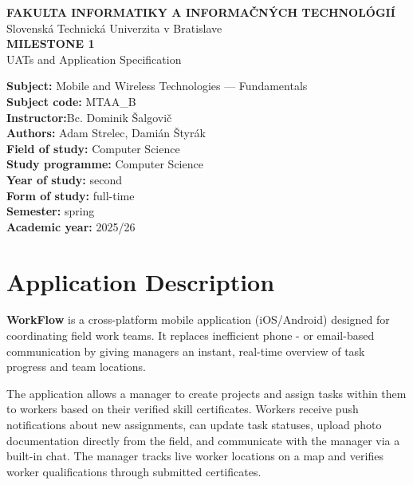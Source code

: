 \documentclass[12pt,a4paper]{article}
\begin{document}
\begin{titlepage}
\begin{center}
    \textbf{FAKULTA INFORMATIKY A INFORMAČNÝCH TECHNOLÓGIÍ}\\
    Slovenská Technická Univerzita v Bratislave\\[3cm]

    {\LARGE\textbf{MILESTONE 1}}\\[0.3cm]
    {\large UATs and Application Specification}\\[3cm]
\end{center}

\vfill

\noindent\textbf{Subject:} Mobile and Wireless Technologies --- Fundamentals\\
\textbf{Subject code:} MTAA\_B\\
\textbf{Instructor:}Bc. Dominik Šalgovič\\
\textbf{Authors:} Adam Strelec, Damián Štyrák\\
\textbf{Field of study:} Computer Science\\
\textbf{Study programme:} Computer Science\\
\textbf{Year of study:} second\\
\textbf{Form of study:} full-time\\
\textbf{Semester:} spring\\
\textbf{Academic year:} 2025/26
\end{titlepage}

\tableofcontents
\newpage

\section{Application Description}

\textbf{WorkFlow} is a cross-platform mobile application (iOS/Android) designed for coordinating field work teams. It replaces inefficient phone - or email-based communication by giving managers an instant, real-time overview of task progress and team locations.

The application allows a manager to create projects and assign tasks within them to workers based on their verified skill certificates. Workers receive push notifications about new assignments, can update task statuses, upload photo documentation directly from the field, and communicate with the manager via a built-in chat. The manager tracks live worker locations on a map and verifies worker qualifications through submitted certificates.
\end{document}
